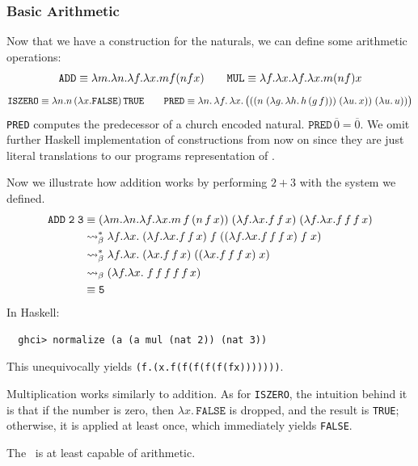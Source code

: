 \subsubsection{\centering Basic Arithmetic}
\begin{definition} Now that we have a construction for the naturals, we can define some arithmetic operations:
\[
  \texttt{ADD} \equiv \lambda m.\lambda n. \lambda f. \lambda x. m f ( n f x) \qquad
  \texttt{MUL} \equiv \lambda f.\lambda x. \lambda f. \lambda x. m (n f) x
  \]
  \[
    \texttt{ISZERO} \equiv \lambda n. n\,(\lambda x.\texttt{FALSE})\,\texttt{TRUE} \qquad
    \texttt{PRED} \equiv \lambda n.\,\lambda f.\,\lambda x.\, \bigl(((n \; (\lambda g.\,\lambda h.\, h\,(g\,f))) \; (\lambda u.\,x)) \;
    (\lambda u.\,u))\bigr)
  \]
\texttt{PRED} computes the predecessor of a church encoded natural. $\texttt{PRED} \, \overline{0} = \overline{0}$. We omit further Haskell implementation of constructions from now on since they are just literal translations to our programs representation of \lterms.
\end{definition}
\begin{example} Now we illustrate how addition works by performing $2 + 3$ with the system we defined.
    \[
    \begin{aligned}
      \texttt{ADD}\;\texttt{2}\;\texttt{3} &\equiv (\lambda m.\lambda n.\lambda f.\lambda x. m\,f\,(n\,f\,x))\;(\lambda f.\lambda x. f\,f\,x)\;(\lambda f.\lambda x. f\,f\,f\,x) \\
                                           &\mathrel{\leadsto}_\beta^* \lambda f.\lambda x.\; (\lambda f.\lambda x. f\,f\,x)\;f\;((\lambda f.\lambda x. f\,f\,f\,x)\;f\;x) \\
                                           &\mathrel{\leadsto}_\beta^* \lambda f.\lambda x.\; (\lambda x. f\,f\,x)\;((\lambda x. f\,f\,f\,x)\;x) \\
                                           &\mathrel{\leadsto}_\beta (\lambda f.\lambda x.\; f\,f\,f\,f\,f\,x) \\
                                           & \equiv \texttt{5}
    \end{aligned}
  \]
  In Haskell:
  \begin{verbatim}
  ghci> normalize (a (a mul (nat 2)) (nat 3))
\end{verbatim}
This unequivocally yields \texttt{(\lambda f.(\lambda x.f(f(f(f(f(fx)))))))}.
\end{example}
\begin{remark}
  Multiplication works similarly to addition. As for \texttt{ISZERO}, the intuition behind it is that if the number is zero, then \(\lambda x.\, \texttt{FALSE}\) is dropped, and the result is \texttt{TRUE}; otherwise, it is applied at least once, which immediately yields \texttt{FALSE}.
  \end{remark}
\begin{remark}
  The \lcalc \ is at least capable of arithmetic.
\end{remark}
